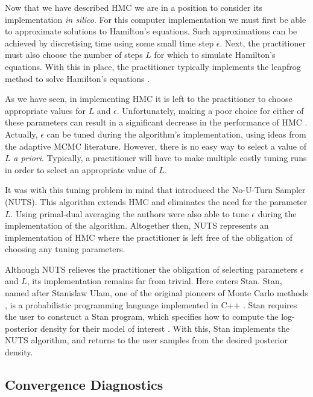 Now that we have described HMC we are in a position to consider its implementation
\emph{in silico}. For this computer implementation we must first be able to approximate
solutions to Hamilton's equations. Such approximations can be achieved by discretising
time using some small time step $\epsilon$. Next, the practitioner must also choose the
number of steps $L$ for which to simulate Hamilton's equations. With this in place, the
practitioner typically implements the leapfrog method to solve Hamilton's equations
\parencite{neal11}.

As we have seen, in implementing HMC it is left to the practitioner to choose appropriate
values for $L$ and $\epsilon$. Unfortunately, making a poor choice for either of these
parameters can result in a significant decrease in the performance of HMC
\parencite{hoffman14}. Actually, $\epsilon$ can be tuned during the algorithm's
implementation, using ideas from the adaptive MCMC literature. However, there is no easy
way to select a value of $L$ \emph{a priori}. Typically, a practitioner will have to make
multiple costly tuning runs in order to select an appropriate value of $L$.

It was with this tuning problem in mind that \textcite{hoffman14} introduced the No-U-Turn
Sampler (NUTS). This algorithm extends HMC and eliminates the need for the parameter $L$.
Using primal-dual averaging the authors were also able to tune $\epsilon$ during the
implementation of the algorithm. Altogether then, NUTS represents an implementation of HMC
where the practitioner is left free of the obligation of choosing any tuning parameters.

Although NUTS relieves the practitioner the obligation of selecting parameters $\epsilon$
and $L$, its implementation remains far from trivial. Here enters Stan. Stan, named after
Stanislaw Ulam, one of the original pioneers of Monte Carlo methods
\parencite{metropolis49}, is a probabilistic programming language implemented in C++
\parencite{gelman15}. Stan requires the user to construct a Stan program, which specifies
how to compute the log-posterior density for their model of interest
\parencite{stanteam15}. With this, Stan implements the NUTS algorithm, and returns to the
user samples from the desired posterior density.

\subsection{Convergence Diagnostics}
\label{ssec:convergence_diagnostics}

